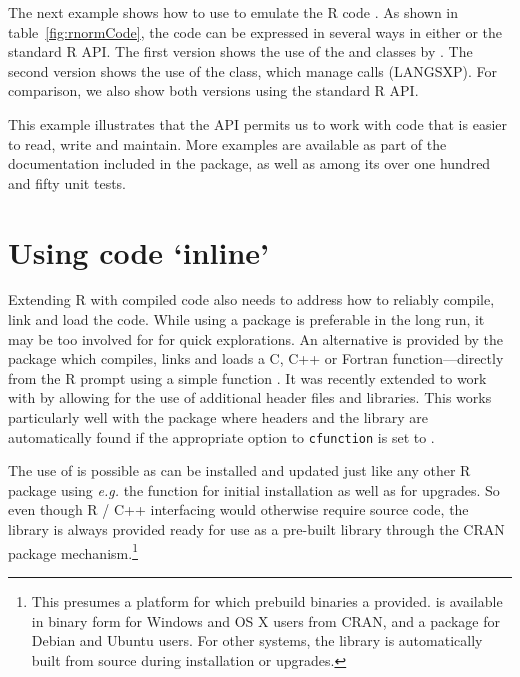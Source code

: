 The next example shows how to use  to emulate the R code
.
%
As shown in table~\ref{fig:rnormCode}, the code can be expressed in several
ways in either  or the standard R API. The first version shows the
use of the  and  classes by
.
The second version shows the use of the  class, which 
manage calls (LANGSXP). 
For comparison, we also show both versions using the standard R API.

This example illustrates that the  API permits us to work with code
that is easier to read, write and maintain. More examples are available as
part of the documentation included in the  package, as well as
among its over one hundred and fifty unit tests.


\section{Using code `inline'}
\label{sec:inline}

Extending R with compiled code also needs to address how to reliably compile,
link and load the code.  While using a package is preferable in the long run,
it may be too involved for for quick explorations.
An alternative is
provided by the  package \citep{cran:inline} which compiles,
links and loads a C, C++ or Fortran function---directly from the R prompt
using a simple function .  It was recently extended to work
with  by allowing for the use of additional header files and
libraries. This works particularly well with the  package where
headers and the library are automatically found if the appropriate option
 to \texttt{cfunction} is set to .

The use of  is possible as  can be installed and
updated just like any other R package using \textsl{e.g.} the
 function for initial installation as well as
 for upgrades.  So even though R / C++ interfacing
would otherwise require source code, the  library is always provided
ready for use as a pre-built library through the CRAN package
mechanism.\footnote{This presumes a platform for which prebuild binaries a
  provided.  is available in binary form for Windows and OS X users from
  CRAN, and a  package for Debian and Ubuntu users. For other systems, the
   library is automatically built from source during installation
  or upgrades.}

